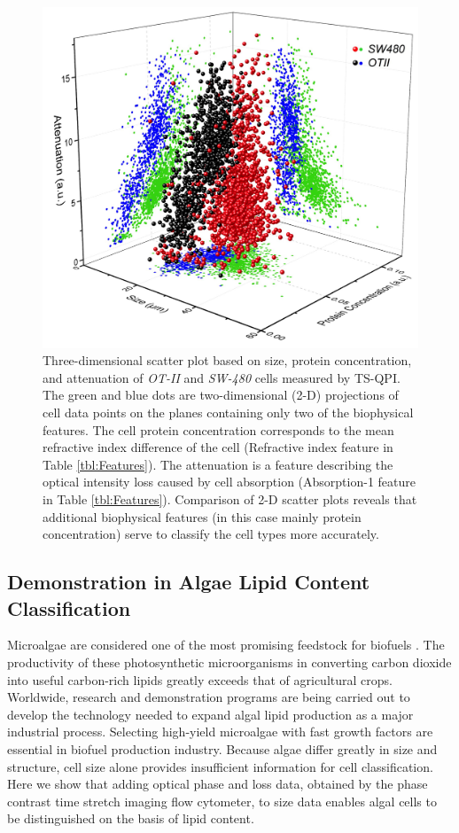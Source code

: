 \documentclass[aps,pra,reprint,longbibliography,superscriptaddress]{revtex4-1}
\begin{document}
\begin{figure}
\includegraphics[scale=0.2]{FigureOTSWScatter.jpg}
\caption{\label{fig:OTSWScatter} Three-dimensional scatter plot based on size, protein concentration, and attenuation of \textit{OT-II} and \textit{SW-480} cells measured by TS-QPI. The green and blue dots are two-dimensional (2-D) projections of cell data points on the planes containing only two of the biophysical features. The cell protein concentration corresponds to the mean refractive index difference of the cell (Refractive index feature in Table \ref{tbl:Features}). The attenuation is a feature describing the optical intensity loss caused by cell absorption (Absorption-1 feature in Table \ref{tbl:Features}). Comparison of 2-D scatter plots reveals that additional biophysical features (in this case mainly protein concentration) serve to classify the cell types more accurately.}
\end{figure}

\subsection{Demonstration in Algae Lipid Content Classification}

Microalgae are considered one of the most promising feedstock for biofuels \cite{merchant2012tag}. The productivity of these photosynthetic microorganisms in converting carbon dioxide into useful carbon-rich lipids greatly exceeds that of agricultural crops. Worldwide, research and demonstration programs are being carried out to develop the technology needed to expand algal lipid production as a major industrial process. Selecting high-yield microalgae with fast growth factors are essential in biofuel production industry. Because algae differ greatly in size and structure, cell size alone provides insufficient information for cell classification. Here we show that adding optical phase and loss data, obtained by the phase contrast time stretch imaging flow cytometer, to size data enables algal cells to be distinguished on the basis of lipid content. 
\end{document}
